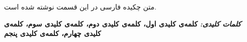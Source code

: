 \begin{center} \Large{} \vspace{1cm} \end{center}
\normalsize

متن چکیده فارسی در این قسمت نوشته شده است. 

\textit{\textbf{کلمات کلیدی:}} 
{\textbf{
		کلمه‌ی کلیدی اول، کلمه‌ی کلیدی دوم، کلمه‌ی کلیدی سوم، کلمه‌ی کلیدی چهارم، کلمه‌ی کلیدی پنجم}}
